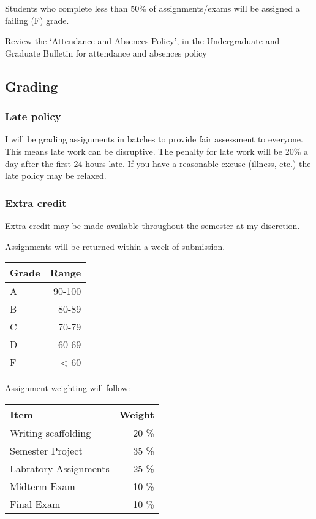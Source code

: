 \documentclass[11pt,]{article}
\begin{document}
Students who complete less than 50\% of assignments/exams will be
assigned a failing (F) grade.

Review the `Attendance and Absences Policy', in the Undergraduate and
Graduate Bulletin for attendance and absences policy

\hypertarget{grading}{%
\subsection{Grading}\label{grading}}

\hypertarget{late-policy}{%
\subsubsection{Late policy}\label{late-policy}}

I will be grading assignments in batches to provide fair assessment to
everyone. This means late work can be disruptive. The penalty for late
work will be 20\% a day after the first 24 hours late. If you have a
reasonable excuse (illness, etc.) the late policy may be relaxed.

\hypertarget{extra-credit}{%
\subsubsection{Extra credit}\label{extra-credit}}

Extra credit may be made available throughout the semester at my
discretion.

Assignments will be returned within a week of submission.

\begin{tabular}{l|r}
\hline
Grade & Range\\
\hline
A & 90-100\\
\hline
B & 80-89\\
\hline
C & 70-79\\
\hline
D & 60-69\\
\hline
F & < 60\\
\hline
\end{tabular}

Assignment weighting will follow:

\begin{tabular}{l|r}
\hline
Item & Weight\\
\hline
Writing scaffolding & 20 \%\\
\hline
Semester Project & 35 \%\\
\hline
Labratory Assignments & 25 \%\\
\hline
Midterm Exam & 10 \%\\
\hline
Final Exam & 10 \%\\
\hline
\end{tabular}
\end{document}
